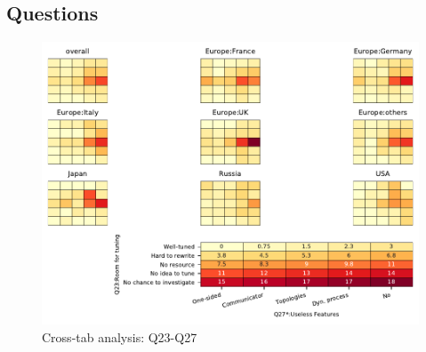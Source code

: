 
\subsection{Questions}


\begin{figure}
\begin{center}
\includegraphics[width=12cm]{../pdfs/Q23-Q27.pdf}
\caption{Cross-tab analysis: Q23-Q27}
\label{fig:Q23-Q27}
\end{center}
\end{figure}
